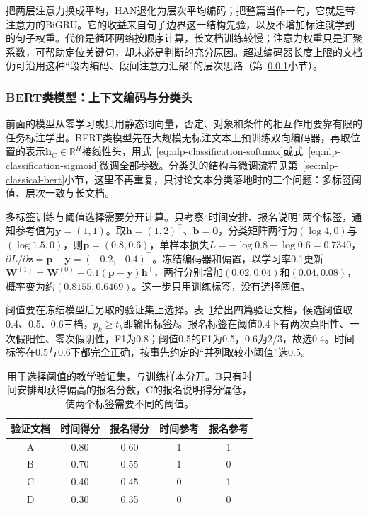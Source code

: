 把两层注意力换成平均，HAN退化为层次平均编码；把整篇当作一句，它就是带注意力的BiGRU。它的收益来自句子边界这一结构先验，以及不增加标注就学到的句子权重。代价是循环网络按顺序计算，长文档训练较慢；注意力权重只是汇聚系数，可帮助定位关键句，却未必是判断的充分原因。超过编码器长度上限的文档仍可沿用这种“段内编码、段间注意力汇聚”的层次思路（第~\ref{sec:nlp-classification-bert}小节）。

\subsubsection{BERT类模型：上下文编码与分类头}
\label{sec:nlp-classification-bert}

前面的模型从零学习或只用静态词向量，否定、对象和条件的相互作用要靠有限的任务标注学出。BERT类模型先在大规模无标注文本上预训练双向编码器，再取\code{[CLS]}位置的表示$\bm h_{\mathrm C}\in\mathbb R^{H}$接线性头，用式~\eqref{eq:nlp-classification-softmax}或式~\eqref{eq:nlp-classification-sigmoid}微调全部参数。分类头的结构与微调流程见第~\ref{sec:nlp-classical-bert}小节，这里不再重复，只讨论文本分类落地时的三个问题：多标签阈值、层次一致与长文档。

多标签训练与阈值选择需要分开计算。只考察“时间安排、报名说明”两个标签，通知参考值为$\bm y=(1,1)$。取$\bm h=(1,2)^\top$、$\bm b=\bm0$，分类矩阵两行为$(\log4,0)$与$(\log1.5,0)$，则$\bm p=(0.8,0.6)$，单样本损失$L=-\log0.8-\log0.6=0.7340$，$\partial L/\partial\bm z=\bm p-\bm y=(-0.2,-0.4)^\top$。冻结编码器和偏置，以学习率0.1更新$\bm W^{(1)}=\bm W^{(0)}-0.1(\bm p-\bm y)\bm h^\top$，两行分别增加$(0.02,0.04)$和$(0.04,0.08)$，概率变为约$(0.8155,0.6469)$。这一步只用训练标签，没有选择阈值。

阈值要在冻结模型后另取的验证集上选择。表~\ref{tab:nlp-classification-thresholds}给出四篇验证文档，候选阈值取0.4、0.5、0.6三档，$p_k\geq t_k$即输出标签$k$。报名标签在阈值0.4下有两次真阳性、一次假阳性、零次假阴性，F1为$0.8$；阈值0.5的F1为0.5，0.6为$2/3$，故选0.4。时间标签在0.5与0.6下都完全正确，按事先约定的“并列取较小阈值”选0.5。

\begin{table}[htbp]
  \centering
  \begin{tabular}{@{}ccccc@{}}
    \toprule
    验证文档 & 时间得分 & 报名得分 & 时间参考 & 报名参考 \\
    \midrule
    A & 0.80 & 0.60 & 1 & 1 \\
    B & 0.70 & 0.55 & 1 & 0 \\
    C & 0.40 & 0.45 & 0 & 1 \\
    D & 0.30 & 0.35 & 0 & 0 \\
    \bottomrule
  \end{tabular}
  \caption{用于选择阈值的教学验证集，与训练样本分开。B只有时间安排却获得偏高的报名分数，C的报名说明得分偏低，使两个标签需要不同的阈值。}
  \label{tab:nlp-classification-thresholds}
\end{table}

